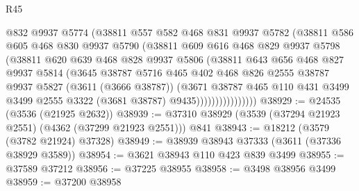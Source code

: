 \begin{lexlean}{R45}
\begin{coremodule}
                      @832
                      @9937
                      @5774
                      (@38811
                        @557
                        @582
                        @468
                        @831
                        @9937
                        @5782
                        (@38811
                          @586
                          @605
                          @468
                          @830
                          @9937
                          @5790
                          (@38811
                            @609
                            @616
                            @468
                            @829
                            @9937
                            @5798
                            (@38811
                              @620
                              @639
                              @468
                              @828
                              @9937
                              @5806
                              (@38811
                                @643
                                @656
                                @468
                                @827
                                @9937
                                @5814
                                (@3645
                                  @38787
                                  @5716
                                  @465
                                  @402
                                  @468
                                  @826
                                  @2555
                                  @38787
                                  @9937
                                  @5827
                                  (@3611 (@3666 @38787))
                                  (@3671
                                    @38787
                                    @465
                                    @110
                                    @431
                                    @3499
                                    @3499
                                    @2555
                                    @3322
                                    (@3681 @38787)
                                    @9435))))))))))))))))
@38929 := @24535 (@3536 (@21925 @2632))
@38939 := @37310 @38929 (@3539 (@37294 @21923 @2551) (@4362 (@37299 @21923 @2551))) @841
@38943 := @18212 (@3579 (@3782 @21924) @37328)
@38949 := @38939 @38943 @37333 (@3611 (@37336 @38929 @3589))
@38954 := @3621 @38943 @110 @423 @839 @3499
@38955 := @37589 @37212
@38956 := @37225 @38955
@38958 := @3498 @38956 @3499
@38959 := @37200 @38958

\end{coremodule}
\end{lexlean}
